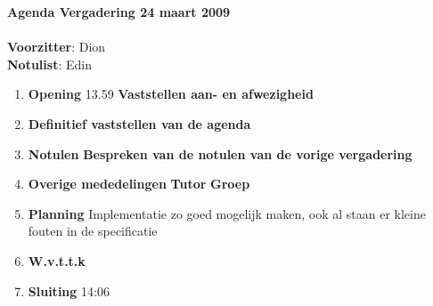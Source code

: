 \documentclass[11pt,oneside,a4paper]{article}
\begin{document}
\textbf{{\LARGE{Agenda Vergadering 24 maart 2009}}}\\ \\
\textbf{Voorzitter}: Dion\\
\textbf{Notulist}: Edin\\
\begin{enumerate}
    \item \textbf{Opening} 13.59
        \subitem \textbf{Vaststellen aan- en afwezigheid}
    \item \textbf{Definitief vaststellen van de agenda}
    \item \textbf{Notulen}
        \subitem \textbf{Bespreken van de notulen van de vorige vergadering}
    \item \textbf{Overige mededelingen}
        \subitem \textbf{Tutor}
        \subitem \textbf{Groep}
    \item \textbf{Planning}
        \subitem \textbf{} Implementatie zo goed mogelijk maken, ook al staan er kleine fouten in de specificatie
    \item \textbf{W.v.t.t.k}
    \item \textbf{Sluiting} 14:06
\end{enumerate}
\end{document}
